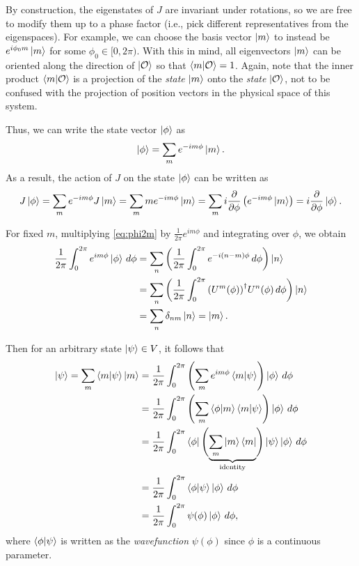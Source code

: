 By construction, the eigenstates of $J$ are invariant under rotations, so we are free to modify them up to a phase factor (i.e., pick  different representatives from the eigenspaces). For example, we can choose the basis vector $\ket{m}$ to instead be $e^{i\phi_0 m}\ket{m}$ for some $\phi_0\in[0,2\pi)$.  With this in mind, all eigenvectors $\ket{m}$ can be oriented along the direction of $\ket{\mathcal{O}}$ so that $\braket{m|\mathcal{O}} = 1$. Again, note that the inner product $\braket{m|\mathcal{O}}$ is a projection of the \textit{state} $\ket{m}$ onto the \textit{state} $\ket{\mathcal{O}}$, not to be confused with the projection of position vectors in the physical space of this system.

Thus, we can write the state vector $\ket{\phi}$ as
\begin{align}
    \ket{\phi} = \sum_{m} e^{-im\phi}\ket{m}.\label{eq:phi2m}
\end{align}
As a result, the action of $J$ on the state $\ket{\phi}$ can be written as
\begin{align*}
    J\ket{\phi} = \sum_{m} e^{-im\phi} J\ket{m} = \sum_{m} m e^{-im\phi}\ket{m} = \sum_{m} i \frac{\partial}{\partial\phi} \left( e^{-im\phi}\ket{m} \right) = i\frac{\partial}{\partial\phi}\ket{\phi}.
\end{align*}

For fixed $m$, multiplying \cref{eq:phi2m} by $\frac{1}{2\pi} e^{im\phi}$ and integrating over $\phi$, we obtain
\begin{align*}
    \frac{1}{2\pi}\int_{0}^{2\pi} e^{im\phi}\ket{\phi} \,d\phi 
        &= \sum_n \left( \frac{1}{2\pi}\int_{0}^{2\pi}e^{-i(n-m)\phi}\,d\phi \right)\ket{n} \\
        &= \sum_n \left( \frac{1}{2\pi}\int_{0}^{2\pi}{(U^m(\phi))}^\dagger U^n(\phi)\,d\phi \right)\ket{n} \\
        &= \sum_n \delta_{nm}\ket{n} = \ket{m}.
\end{align*}

Then for an arbitrary state $\ket{\psi}\in V$, it follows that
\begin{align*}
    \ket{\psi} = \sum_m \braket{m|\psi}\ket{m} 
        &= \frac{1}{2\pi}\int_{0}^{2\pi} \left( \sum_m e^{im\phi}\braket{m|\psi} \right)\ket{\phi} \,d\phi \\
        &= \frac{1}{2\pi}\int_{0}^{2\pi} \left( \sum_m \braket{\phi|m}\braket{m|\psi} \right)\ket{\phi} \,d\phi \\
        &= \frac{1}{2\pi}\int_{0}^{2\pi} \bra{\phi}\Biggl( \underbrace{\sum_m \ket{m}\bra{m}}_{\textrm{identity}} \Biggr)\ket{\psi}\ket{\phi} \,d\phi \\
        &= \frac{1}{2\pi}\int_{0}^{2\pi} \braket{\phi|\psi}\ket{\phi} \,d\phi \\
        &= \frac{1}{2\pi}\int_{0}^{2\pi} \psi(\phi)\ket{\phi} \,d\phi,
\end{align*}
where $\braket{\phi|\psi}$ is written as the \textit{wavefunction} $\psi(\phi)$ since $\phi$ is a continuous parameter.

